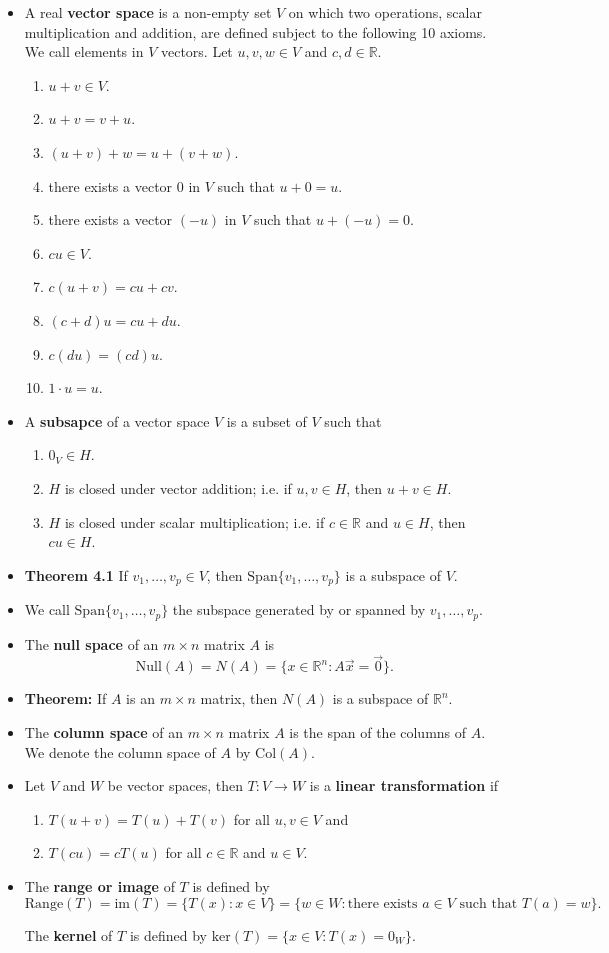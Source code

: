\begin{itemize}
\item A real {\bf vector space} is a non-empty set $V$ on which two operations, scalar multiplication and addition, are defined subject to the following 10 axioms. We call elements in $V$ vectors. Let $u,v,w \in V$ and $c,d\in \mathbb{R}$.
\begin{enumerate}
\item $u+v \in V$.
\item $u+v=v+u$.
\item $(u+v)+w=u+(v+w)$.
\item there exists a vector $0$ in $V$ such that $u+0=u$.
\item there exists a vector $(-u)$ in $V$ such that $u+(-u)=0$.
\item $cu \in V$.
\item $c(u+v)=cu+cv$.
\item $(c+d)u=cu+du$.
\item $c(du)=(cd)u$.
\item $1\cdot u =u$.
\end{enumerate}
\item A {\bf subsapce} of a vector space $V$ is a subset of $V$ such that
\begin{enumerate}
\item $0_V \in H$.
\item $H$ is closed under vector addition; i.e. if $u, v \in H$, then $u+v \in H$.
\item $H$ is closed under scalar multiplication; i.e. if $c \in \mathbb{R}$ and $u \in H$, then $cu \in H$.
\end{enumerate}
\item {\bf Theorem 4.1} If $v_1, \dots, v_p \in V$, then $\text{Span}\{v_1 ,\dots, v_p\}$ is a subspace of $V$. 
\item We call $\text{Span}\{v_1 ,\dots, v_p\}$ the subspace generated by or spanned by $v_1,\dots, v_p$.
\item 	The {\bf null space} of an $m \times n$ matrix $A$ is $$\text{Null}(A)=N(A)=\{x \in \mathbb{R}^n : A\vec{x}=\vec{0}\}.$$
\item {\bf Theorem:} If $A$ is an $m\times n$ matrix, then $N(A)$ is a subspace of $\mathbb{R}^n$.
\item 	The {\bf column space} of an $m\times n$ matrix $A$ is the span of the columns of $A$. We denote the column space of $A$ by $\text{Col}(A)$.\
\item Let $V$ and $W$ be vector spaces, then $T: V \to W$ is a {\bf linear transformation} if 
\begin{enumerate}
	\item $T(u+v)=T(u)+T(v)$ for all $u, v \in V$ and 
	\item $T(c u)=c T(u)$ for all $c \in \mathbb{R}$ and $u \in V$.
\end{enumerate}
\item 	The {\bf range or image } of $T$ is defined by $$\text{Range}(T)=\text{im}(T)=\{T(x): x \in V\}=\{w\in W: \text{there exists } a \in V \text{ such that } T(a)=w\}.$$ 

The {\bf kernel} of $T$ is defined by $\text{ker}(T)=\{ x \in V: T(x)=0_W\}.$
\end{itemize}

